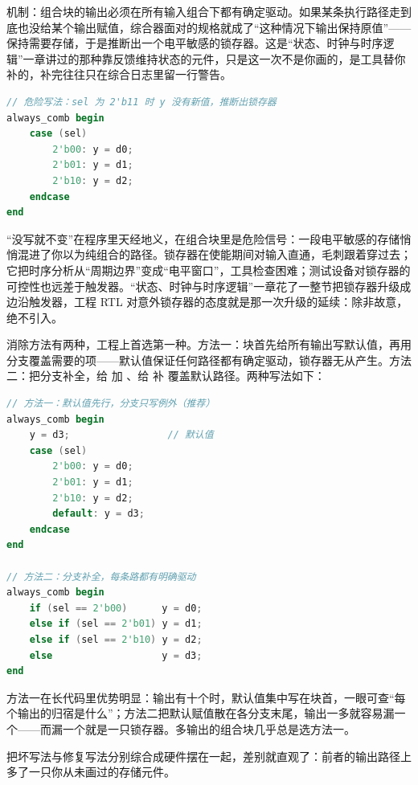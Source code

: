 机制：组合块的输出必须在所有输入组合下都有确定驱动。如果某条执行路径走到底也没给某个输出赋值，综合器面对的规格就成了“这种情况下输出保持原值”——保持需要存储，于是推断出一个电平敏感的锁存器。这是“状态、时钟与时序逻辑”一章讲过的那种靠反馈维持状态的元件，只是这一次不是你画的，是工具替你补的，补完往往只在综合日志里留一行警告。

\begin{lstlisting}[language=Verilog]
// 危险写法：sel 为 2'b11 时 y 没有新值，推断出锁存器
always_comb begin
    case (sel)
        2'b00: y = d0;
        2'b01: y = d1;
        2'b10: y = d2;
    endcase
end
\end{lstlisting}

“没写就不变”在程序里天经地义，在组合块里是危险信号：一段电平敏感的存储悄悄混进了你以为纯组合的路径。锁存器在使能期间对输入直通，毛刺跟着穿过去；它把时序分析从“周期边界”变成“电平窗口”，工具检查困难；测试设备对锁存器的可控性也远差于触发器。“状态、时钟与时序逻辑”一章花了一整节把锁存器升级成边沿触发器，工程 RTL 对意外锁存器的态度就是那一次升级的延续：除非故意，绝不引入。

消除方法有两种，工程上首选第一种。方法一：块首先给所有输出写默认值，再用分支覆盖需要的项——默认值保证任何路径都有确定驱动，锁存器无从产生。方法二：把分支补全，给  加 、给  补  覆盖默认路径。两种写法如下：

\begin{lstlisting}[language=Verilog]
// 方法一：默认值先行，分支只写例外（推荐）
always_comb begin
    y = d3;                 // 默认值
    case (sel)
        2'b00: y = d0;
        2'b01: y = d1;
        2'b10: y = d2;
        default: y = d3;
    endcase
end

// 方法二：分支补全，每条路都有明确驱动
always_comb begin
    if (sel == 2'b00)      y = d0;
    else if (sel == 2'b01) y = d1;
    else if (sel == 2'b10) y = d2;
    else                   y = d3;
end
\end{lstlisting}

方法一在长代码里优势明显：输出有十个时，默认值集中写在块首，一眼可查“每个输出的归宿是什么”；方法二把默认赋值散在各分支末尾，输出一多就容易漏一个——而漏一个就是一只锁存器。多输出的组合块几乎总是选方法一。

把坏写法与修复写法分别综合成硬件摆在一起，差别就直观了：前者的输出路径上多了一只你从未画过的存储元件。

